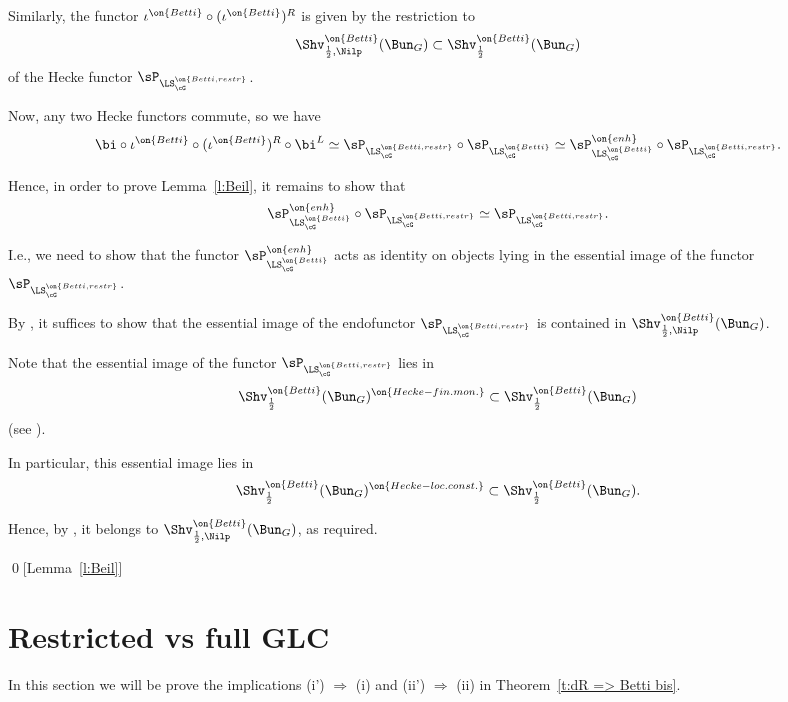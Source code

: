 \documentclass[9pt]{amsart}
\theoremstyle{remark}
\theoremstyle{definition}
\theoremstyle{remark}
\newcommand{\thmref}[1]{Theorem~\ref{#1}}
\newcommand{\lemref}[1]{Lemma~\ref{#1}}
\numberwithin{equation}{section}
\begin{document}
\medskip

Similarly, the functor $\iota^{\on{Betti}}\circ (\iota^{\on{Betti}})^R$ is given by the restriction to 
$$\Shv^{\on{Betti}}_{\frac{1}{2},\Nilp}(\Bun_G)\subset \Shv^{\on{Betti}}_{\frac{1}{2}}(\Bun_G)$$
of the Hecke functor $\sP_{\LS_\cG^{\on{Betti,restr}}}$. 

\medskip

Now, any two Hecke functors commute, so we have
$$\bi\circ \iota^{\on{Betti}}\circ 
(\iota^{\on{Betti}})^R\circ \bi^L\simeq \sP_{\LS_\cG^{\on{Betti,restr}}}\circ \sP_{\LS_\cG^{\on{Betti}}} \simeq 
\sP^{\on{enh}}_{\LS_\cG^{\on{Betti}}}\circ \sP_{\LS_\cG^{\on{Betti,restr}}}.$$

\sssec{}

Hence, in order to prove \lemref{l:Beil}, it remains to show that 
$$\sP^{\on{enh}}_{\LS_\cG^{\on{Betti}}}\circ \sP_{\LS_\cG^{\on{Betti,restr}}}\simeq \sP_{\LS_\cG^{\on{Betti,restr}}}.$$

I.e., we need to show that the functor $\sP^{\on{enh}}_{\LS_\cG^{\on{Betti}}}$ acts as identity on objects lying
in the essential image of the functor $\sP_{\LS_\cG^{\on{Betti,restr}}}$.

\medskip

By \cite[Corollary 18.2.9(a)]{AGKRRV}, it suffices to show that the essential image of the endofunctor 
$\sP_{\LS_\cG^{\on{Betti,restr}}}$ is contained in $\Shv^{\on{Betti}}_{\frac{1}{2},\Nilp}(\Bun_G)$.

\sssec{}

Note that the essential image of the functor $\sP_{\LS_\cG^{\on{Betti,restr}}}$ lies in 
$$\Shv^{\on{Betti}}_{\frac{1}{2}}(\Bun_G)^{\on{Hecke-fin.mon.}}\subset \Shv^{\on{Betti}}_{\frac{1}{2}}(\Bun_G)$$
(see \cite[Sect. 18.3]{AGKRRV}). 

\medskip

In particular, this essential image lies in 
$$\Shv^{\on{Betti}}_{\frac{1}{2}}(\Bun_G)^{\on{Hecke-loc.const.}}\subset 
\Shv^{\on{Betti}}_{\frac{1}{2}}(\Bun_G).$$

Hence, by \cite[Theorem 18.1.6]{AGKRRV}, it belongs to $\Shv^{\on{Betti}}_{\frac{1}{2},\Nilp}(\Bun_G)$, as required. 

\qed[\lemref{l:Beil}]

\section{Restricted vs full GLC} \label{s:restricted vs full}

In this section we will be prove the implications (i') $\Rightarrow$ (i) and (ii') $\Rightarrow$ (ii) 
in \thmref{t:dR => Betti bis}. 
\end{document}
